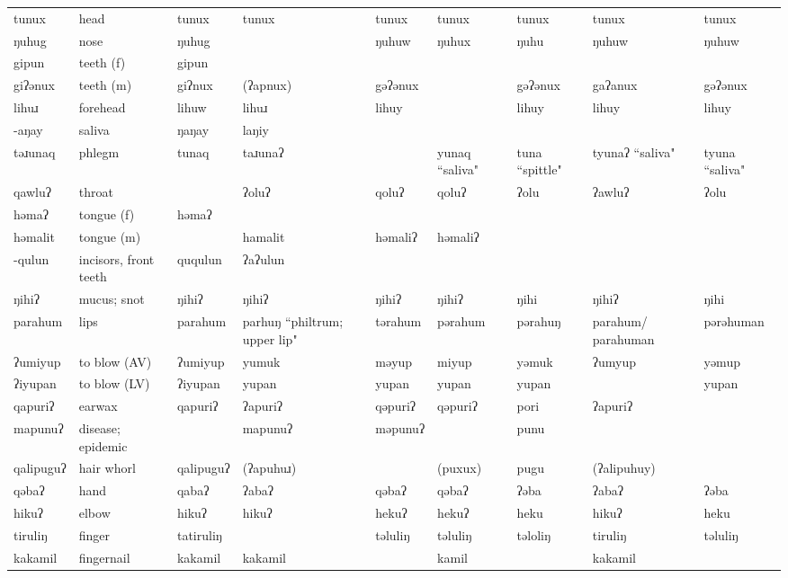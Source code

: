 \begin{landscape}
\begin{longtable}{*{9}{>{\raggedright\arraybackslash}p{}}}
\text{*}tunux & head & tunux & tunux & tunux & tunux & tunux & tunux & tunux\\
\text{*}ŋuhug & nose & ŋuhug &  & ŋuhuw & ŋuhux & ŋuhu & ŋuhuw & ŋuhuw\\
\text{*}gipun & teeth (f) & gipun &  &  &  &  &  & \\
\text{*}giʔənux & teeth (m) & giʔnux & (ʔapnux) & gəʔənux &  & gəʔənux & gaʔanux & gəʔənux\\
\text{*}lihuɹ & forehead & lihuw & lihuɹ & lihuy &  & lihuy & lihuy & lihuy\\
\text{*}-aŋay & saliva & ŋaŋay & laŋiy &  &  &  &  & \\
\text{*}təɹunaq & phlegm & tunaq & taɹunaʔ &  & yunaq ``saliva" & tuna ``spittle" & tyunaʔ ``saliva" & tyuna ``saliva"\\
\text{*}qawluʔ & throat &  & ʔoluʔ & qoluʔ & qoluʔ & ʔolu & ʔawluʔ & ʔolu\\
\text{*}həmaʔ & tongue (f) & həmaʔ &  &  &  &  &  & \\
\text{*}həmalit & tongue (m) &  & hamalit & həmaliʔ & həmaliʔ &  &  & \\
\text{*}-qulun & incisors, front teeth & ququlun & ʔaʔulun &  &  &  &  & \\
\text{*}ŋihiʔ & mucus; snot & ŋihiʔ & ŋihiʔ & ŋihiʔ & ŋihiʔ & ŋihi & ŋihiʔ & ŋihi\\
\text{*}parahum & lips & parahum & parhuŋ ``philtrum; upper lip" & tərahum & pərahum & pərahuŋ & parahum/ parahuman & pərəhuman\\
\text{*}ʔumiyup & to blow (AV) & ʔumiyup & yumuk & məyup & miyup & yəmuk & ʔumyup & yəmup\\
\text{*}ʔiyupan & to blow (LV) & ʔiyupan & yupan & yupan & yupan & yupan &  & yupan\\
\text{*}qapuriʔ & earwax & qapuriʔ & ʔapuriʔ & qəpuriʔ & qəpuriʔ & pori & ʔapuriʔ & \\
\text{*}mapunuʔ & disease; epidemic &  & mapunuʔ & məpunuʔ &  & punu &  & \\
\text{*}qalipuguʔ & hair whorl & qalipuguʔ & (ʔapuhuɹ) &  & (puxux) & pugu & (ʔalipuhuy) & \\
\text{*}qəbaʔ & hand & qabaʔ & ʔabaʔ & qəbaʔ & qəbaʔ & ʔəba & ʔabaʔ & ʔəba\\
\text{*}hikuʔ & elbow & hikuʔ & hikuʔ & hekuʔ & hekuʔ & heku & hikuʔ & heku\\
\text{*}tiruliŋ & finger & tatiruliŋ &  & təluliŋ & təluliŋ & təloliŋ & tiruliŋ & təluliŋ\\
\text{*}kakamil & fingernail & kakamil & kakamil &  & kamil &  & kakamil & \\

\end{longtable}
\end{landscape}
